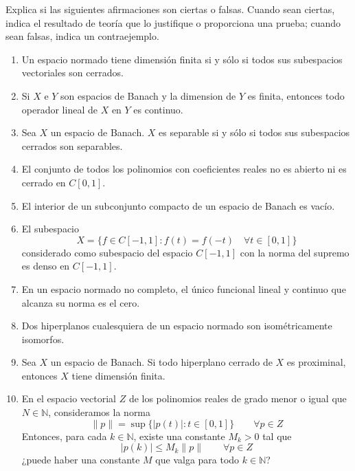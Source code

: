 \documentclass[12pt]{article}
\begin{document}
    \begin{ejercicio}
        Explica si las siguientes afirmaciones son ciertas o falsas. Cuando sean ciertas, indica el resultado de teoría que lo justifique o proporciona una prueba; cuando sean falsas, indica un contraejemplo.
        \begin{enumerate}
            \item Un espacio normado tiene dimensión finita si y sólo si todos sus subespacios vectoriales son cerrados.
            \item Si $X$ e $Y$ son espacios de Banach y la dimension de $Y$ es finita, entonces todo operador lineal de $X$ en $Y$ es continuo.
            \item Sea $X$ un espacio de Banach. $X$ es separable si y sólo si todos sus subespacios cerrados son separables.
            \item El conjunto de todos los polinomios con coeficientes reales no es abierto ni es cerrado en $C[0,1]$.
            \item El interior de un subconjunto compacto de un espacio de Banach es vacío.
            \item El subespacio
                \begin{equation*}
                    X = \{f\in C[-1,1] : f(t) = f(-t) \quad \forall t\in [0,1]\}
                \end{equation*}
                considerado como subespacio del espacio $C[-1,1]$ con la norma del supremo es denso en $C[-1,1]$.
            \item En un espacio normado no completo, el único funcional lineal y continuo que alcanza su norma es el cero.
            \item Dos hiperplanos cualesquiera de un espacio normado son isométricamente isomorfos.
            \item Sea $X$ un espacio de Banach. Si todo hiperplano cerrado de $X$ es proximinal, entonces $X$ tiene dimensión finita.
            \item En el espacio vectorial $Z$ de los polinomios reales de grado menor o igual que $N\in \mathbb{N}$, consideramos la norma
                \begin{equation*}
                    \|p\| = \sup\{|p(t)| : t\in [0,1]\} \qquad \forall p\in Z
                \end{equation*}
                Entonces, para cada $k\in \mathbb{N}$, existe una constante $M_k>0$ tal que
                \begin{equation*}
                    |p(k)| \leq M_k\|p\| \qquad \forall p\in Z
                \end{equation*}
                ¿puede haber una constante $M$ que valga para todo $k\in \mathbb{N}$?
        \end{enumerate}
    \end{ejercicio}
\end{document}
